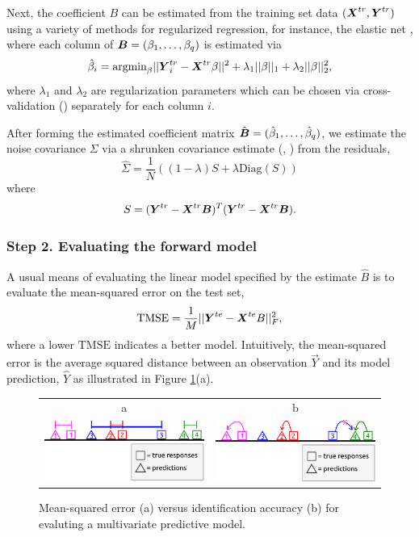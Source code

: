 Next, the coefficient $B$ can be estimated from the training set data
$(\boldsymbol{X}^{tr}, \boldsymbol{Y}^{tr})$ using a variety of methods for regularized
regression, for instance, the elastic net \cite{Zou2005}, where each
column of $\boldsymbol{B} = (\beta_1,\hdots, \beta_q)$ is estimated via
\[
\hat{\beta}_i = \text{argmin}_\beta ||\boldsymbol{Y}_i^{tr} - \boldsymbol{X}^{tr} \beta||^2 + \lambda_1 ||\beta||_1 + \lambda_2 ||\beta||_2^2,
\]
where $\lambda_1$ and $\lambda_2$ are regularization parameters which
can be chosen via cross-validation (\cite{Hastie2009a}) separately for
each column $i$.

After forming the estimated coefficient matrix $\hat{\boldsymbol{B}} =
(\hat{\beta}_1,\hdots, \hat{\beta}_q)$, we estimate the noise
covariance $\Sigma$ via a shrunken covariance
estimate (\cite{Ledoit2004}, \cite{Daniels2001}) from the residuals,
\[
\hat{\Sigma} = \frac{1}{N} ((1-\lambda) S + \lambda \text{Diag}(S)) 
\]
where
\[
S = (\boldsymbol{Y}^{tr} - \boldsymbol{X}^{tr} \boldsymbol{B})^T (\boldsymbol{Y}^{tr} - \boldsymbol{X}^{tr} \boldsymbol{B}).
\]

\subsubsection{Step 2. Evaluating the forward model}

A usual means of evaluating the linear model specified by the estimate
$\hat{B}$ is to evaluate the mean-squared error on the test set,
\[
\text{TMSE} = \frac{1}{M}||\boldsymbol{Y}^{te} - \boldsymbol{X}^{te} B||^2_F,
\]
where a lower $\text{TMSE}$ indicates a better model.  Intuitively,
the mean-squared error is the average squared distance between an
observation $\vec{Y}$ and its model prediction, $\hat{Y}$
as illustrated in Figure \ref{fig:mse_vs_ia}(a).

\begin{figure}
\centering
\begin{tabular}{cc}
a & b\\
\includegraphics[scale = 0.3]{../../diagram/idloss2a.png} &
\includegraphics[scale = 0.3]{../../diagram/idloss2b.png} \\
\end{tabular}
\caption{Mean-squared error (a) versus identification accuracy (b) for
  evaluting a multivariate predictive model.}
\label{fig:mse_vs_ia}
\end{figure}

